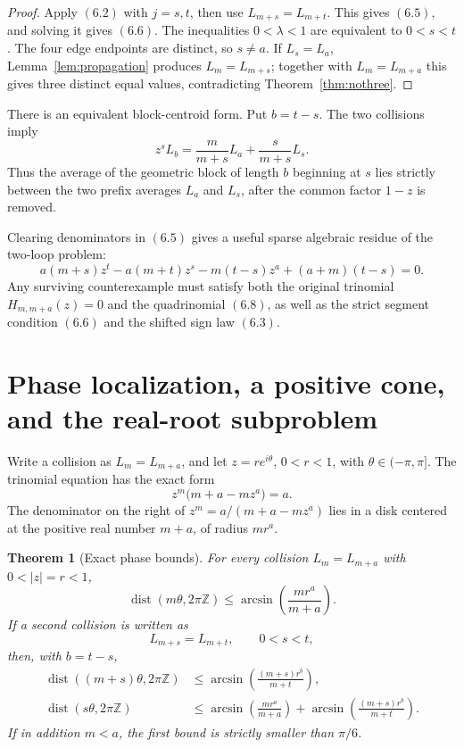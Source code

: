 \documentclass[11pt]{article}
\newtheorem{theorem}{Theorem}[section]
\theoremstyle{definition}
\newcommand{\Z}{\mathbb Z}
\begin{document}
\begin{proof}
Apply \((6.2)\) with \(j=s,t\), then use
\(L_{m+s}=L_{m+t}\).  This gives \((6.5)\), and solving it gives
\((6.6)\).  The inequalities \(0<\lambda<1\) are equivalent to \(0<s<t\).
The four edge endpoints are distinct, so \(s\neq a\).  If
\(L_s=L_a\), Lemma~\ref{lem:propagation} produces
\(L_m=L_{m+s}\); together with \(L_m=L_{m+a}\) this gives three
distinct equal values, contradicting Theorem~\ref{thm:nothree}.
\end{proof}

There is an equivalent block-centroid form.  Put \(b=t-s\).  The two
collisions imply
\begin{equation}
 z^sL_b
 =\frac{m}{m+s}L_a+\frac{s}{m+s}L_s.
 \tag{6.7}
\end{equation}
Thus the average of the geometric block of length \(b\) beginning at \(s\)
lies strictly between the two prefix averages \(L_a\) and \(L_s\), after the
common factor \(1-z\) is removed.

Clearing denominators in \((6.5)\) gives a useful sparse algebraic residue of
the two-loop problem:
\begin{equation}
 a(m+s)z^t-a(m+t)z^s-m(t-s)z^a+(a+m)(t-s)=0.
 \tag{6.8}
\end{equation}
Any surviving counterexample must satisfy both the original trinomial
\(H_{m,m+a}(z)=0\) and the quadrinomial \((6.8)\), as well as the strict
segment condition \((6.6)\) and the shifted sign law \((6.3)\).

\section{Phase localization, a positive cone, and the real-root subproblem}
\label{sec:phase}

Write a collision as \(L_m=L_{m+a}\), and let
\(z=re^{i\theta}\), \(0<r<1\), with \(\theta\in(-\pi,\pi]\).
The trinomial equation has the exact form
\begin{equation}
 z^m\bigl(m+a-mz^a\bigr)=a.
 \tag{7.1}
\end{equation}
The denominator on the right of
\(z^m=a/(m+a-mz^a)\) lies in a disk centered at the positive real number
\(m+a\), of radius \(mr^a\).

\begin{theorem}[Exact phase bounds]\label{thm:phase}
For every collision \(L_m=L_{m+a}\) with \(0<|z|=r<1\),
\begin{equation}
 \operatorname{dist}(m\theta,2\pi\Z)
 \leq
 \arcsin\!\left(\frac{mr^a}{m+a}\right).
 \tag{7.2}
\end{equation}
If a second collision is written as
\[
 L_{m+s}=L_{m+t},\qquad 0<s<t,
\]
then, with \(b=t-s\),
\begin{align}
 \operatorname{dist}((m+s)\theta,2\pi\Z)
 &\leq
 \arcsin\!\left(\frac{(m+s)r^b}{m+t}\right),
 \tag{7.3}\\
 \operatorname{dist}(s\theta,2\pi\Z)
 &\leq
 \arcsin\!\left(\frac{mr^a}{m+a}\right)
 +\arcsin\!\left(\frac{(m+s)r^b}{m+t}\right).
 \tag{7.4}
\end{align}
If in addition \(m<a\), the first bound is strictly smaller than \(\pi/6\).
\end{theorem}
\end{document}
